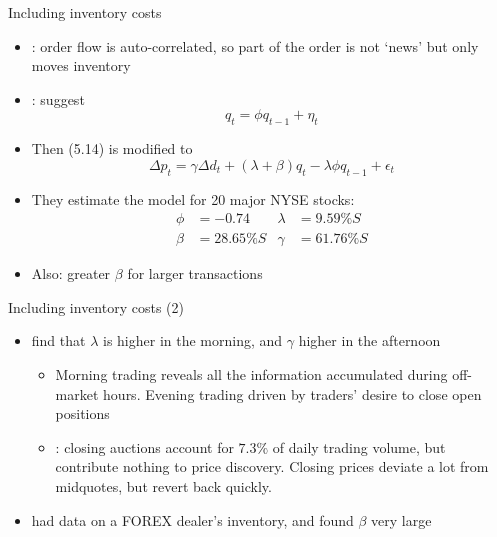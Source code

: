 \documentclass[english,10pt
,aspectratio=169
]{beamer}
\begin{document}
\begin{frame}[label=extending]{Including inventory costs}
	\begin{itemize}
		\item \textbf{\cite{hasbrouck_trades_1988}}: order flow is auto-correlated, so part of the order is not `news' but only moves inventory
		\item \textbf{\cite{huang_components_1997}}: suggest
		\begin{equation}\tag{5.17}
		q_t = \phi q_{t-1} + \eta_t
		\end{equation}
		\item Then (5.14) is modified to \hyperlink{derivation}{}
		\begin{equation} \tag{5.21}
		\Delta p_t = \gamma \Delta d_t + (\lambda+\beta)q_t - \lambda \phi q_{t-1} + \epsilon_t
		\end{equation}
		\item They estimate the model for 20 major NYSE stocks: 
		\begin{align*}
			\phi &= -0.74	& \lambda &= 9.59\% S
			\\
			\beta &= 28.65\% S	& \gamma &= 61.76\% S
		\end{align*}
		\item Also: greater $\beta$ for larger transactions
	\end{itemize}
\end{frame}


\begin{frame}{Including inventory costs (2)}
		\begin{itemize}
			\item \textbf{\citet*{madhavan_why_1997}} find that $\lambda$ is higher in the morning, and $\gamma$ higher in the afternoon
			\begin{itemize}
				\item Morning trading reveals all the information accumulated during off-market hours. Evening trading driven by traders' desire to close open positions
				\item \textbf{\cite{bogousslavsky_should_2020}}: closing auctions account for $7.3\%$ of daily trading volume, but contribute nothing to price discovery. Closing prices deviate a lot from midquotes, but revert back quickly.
			\end{itemize}
			\item \textbf{\cite{lyons_tests_1995}} had data on a FOREX dealer's inventory, and found $\beta$ very large
		\end{itemize}
\end{frame}
\end{document}
